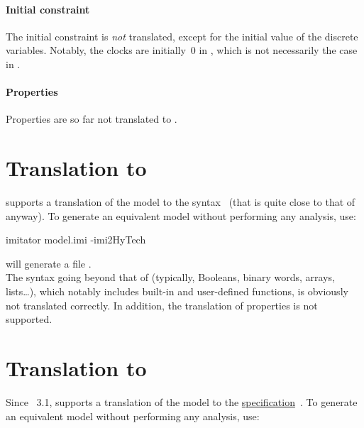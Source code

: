 \paragraph{Initial constraint}
The initial constraint is \emph{not} translated, except for the initial value of the discrete variables.
Notably, the clocks are initially~0 in \uppaal{}, which is not necessarily the case in \imitator{}.

\paragraph{Properties}
Properties are so far not translated to \uppaal{}.



\section{Translation to \hytech{}}\label{section:hytech}

\imitator{} supports a translation of the model to the \hytech{} syntax~\cite{HHW95} (that is quite close to that of \imitator{} anyway).
To generate an equivalent \hytech{} model without performing any analysis, use:

\begin{terminal}
imitator model.imi -imi2HyTech
\end{terminal}

\imitator{} will generate a file . \\

The syntax going beyond that of \hytech{} (typically, Booleans, binary words, arrays, lists…), which notably includes \imitator{} built-in and user-defined functions, is obviously not translated correctly.
In addition, the translation of properties is not supported.


\section{Translation to \jani{}}\label{section:jani}

Since \imitator{}~3.1, \imitator{} supports a translation of the model to the \href{https://jani-spec.org/}{\jani{} specification}~\cite{BDHHJT17}.
To generate an equivalent \jani{} model without performing any analysis, use:

